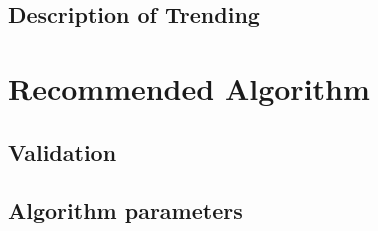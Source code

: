 \documentclass[MS]{spherex}
\begin{document}
\subsection{Description of Trending}

\section{Recommended Algorithm}

\subsection{Validation}

\subsection{Algorithm parameters}


\end{document}
